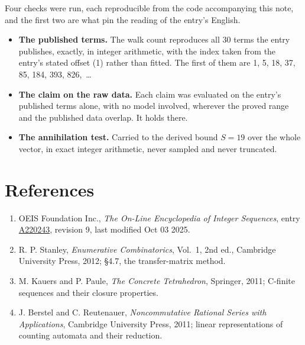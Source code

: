 \documentclass[11pt]{article}
\theoremstyle{definition}
\begin{document}
Four checks were run, each reproducible from the code accompanying this note, and the first two are what pin the reading of the entry's English.

\begin{itemize}

\item {\bfseries The published terms.} The walk count reproduces all 30 terms the entry publishes, exactly, in integer arithmetic, with the index taken from the entry's stated offset (1) rather than fitted. The first of them are 1, 5, 18, 37, 85, 184, 393, 826,~\dots

\item {\bfseries The claim on the raw data.} Each claim was evaluated on the entry's published terms alone, with no model involved, wherever the proved range and the published data overlap. It holds there.

\item {\bfseries The annihilation test.} Carried to the derived bound $S = 19$ over the whole vector, in exact integer arithmetic, never sampled and never truncated.

\end{itemize}

\section{References}

\begin{enumerate}

\item OEIS Foundation Inc., \emph{The On-Line Encyclopedia of Integer Sequences}, entry \href{https://oeis.org/A220243}{A220243}, revision 9, last modified Oct 03 2025.

\item R. P. Stanley, \emph{Enumerative Combinatorics}, Vol.~1, 2nd ed., Cambridge University Press, 2012; \S4.7, the transfer-matrix method.

\item M. Kauers and P. Paule, \emph{The Concrete Tetrahedron}, Springer, 2011; C-finite sequences and their closure properties.

\item J. Berstel and C. Reutenauer, \emph{Noncommutative Rational Series with Applications}, Cambridge University Press, 2011; linear representations of counting automata and their reduction.

\end{enumerate}
\end{document}
